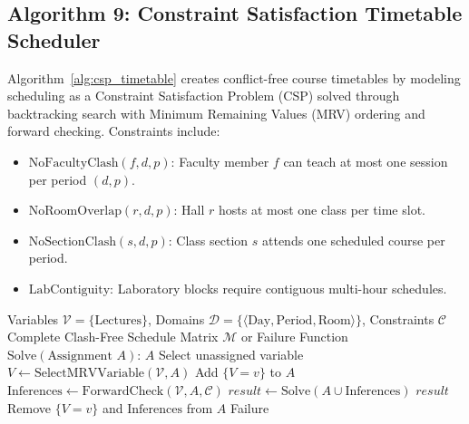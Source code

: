 \documentclass[conference]{IEEEtran}
\begin{document}
\subsection{Algorithm 9: Constraint Satisfaction Timetable Scheduler}
Algorithm~\ref{alg:csp_timetable} creates conflict-free course timetables by modeling scheduling as a Constraint Satisfaction Problem (CSP) solved through backtracking search with Minimum Remaining Values (MRV) ordering and forward checking. Constraints include:
\begin{itemize}
    \item $\text{NoFacultyClash}(f, d, p)$: Faculty member $f$ can teach at most one session per period $(d, p)$.
    \item $\text{NoRoomOverlap}(r, d, p)$: Hall $r$ hosts at most one class per time slot.
    \item $\text{NoSectionClash}(s, d, p)$: Class section $s$ attends one scheduled course per period.
    \item $\text{LabContiguity}$: Laboratory blocks require contiguous multi-hour schedules.
\end{itemize}

\begin{algorithm}[htbp]
\caption{CSP Backtracking Timetable Scheduler}
\label{alg:csp_timetable}
\begin{algorithmic}[1]
\REQUIRE Variables $\mathcal{V} = \{ \text{Lectures} \}$, Domains $\mathcal{D} = \{ \langle \text{Day}, \text{Period}, \text{Room} \rangle \}$, Constraints $\mathcal{C}$
\ENSURE Complete Clash-Free Schedule Matrix $\mathcal{M}$ or Failure
\STATE Function $\text{Solve}(\text{Assignment } A)$:
    \RETURN $A$
\ENDIF
\STATE Select unassigned variable $V \leftarrow \text{SelectMRVVariable}(\mathcal{V}, A)$
        \STATE Add $\{V = v\}$ to $A$
        \STATE $\text{Inferences} \leftarrow \text{ForwardCheck}(\mathcal{V}, A, \mathcal{C})$
            \STATE $result \leftarrow \text{Solve}(A \cup \text{Inferences})$
                \RETURN $result$
            \ENDIF
        \ENDIF
        \STATE Remove $\{V = v\}$ and $\text{Inferences}$ from $A$
    \ENDIF
\ENDFOR
\RETURN Failure
\end{algorithmic}
\end{algorithm}
\end{document}
